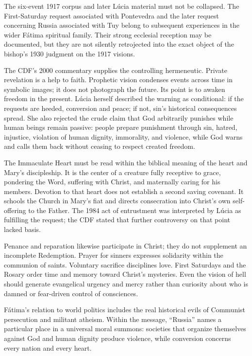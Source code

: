The six-event 1917 corpus and later Lúcia material must not be collapsed. The First-Saturday request associated with Pontevedra and the later request concerning Russia associated with Tuy belong to subsequent experiences in the wider Fátima spiritual family. Their strong ecclesial reception may be documented, but they are not silently retrojected into the exact object of the bishop's 1930 judgment on the 1917 visions.

The CDF's 2000 commentary supplies the controlling hermeneutic. Private revelation is a help to faith. Prophetic vision condenses events across time in symbolic images; it does not photograph the future. Its point is to awaken freedom in the present. Lúcia herself described the warning as conditional: if the requests are heeded, conversion and peace; if not, sin's historical consequences spread. She also rejected the crude claim that God arbitrarily punishes while human beings remain passive: people prepare punishment through sin, hatred, injustice, violation of human dignity, immorality, and violence, while God warns and calls them back without ceasing to respect created freedom.

The Immaculate Heart must be read within the biblical meaning of the heart and Mary's discipleship. It is the center of a creature fully receptive to grace, pondering the Word, suffering with Christ, and maternally caring for his members. Devotion to that heart does not establish a second saving covenant. It schools the Church in Mary's fiat and directs consecration into Christ's own self-offering to the Father. The 1984 act of entrustment was interpreted by Lúcia as fulfilling the request; the CDF stated that further controversy on that point lacked basis.

Penance and reparation likewise participate in Christ; they do not supplement an incomplete Redemption. Prayer for sinners expresses solidarity within the communion of saints. Voluntary sacrifice disciplines love. First Saturdays and the Rosary order time and memory toward Christ's mysteries. Even the vision of hell should generate evangelical urgency and mercy rather than curiosity about who is damned or fear-driven control of consciences.

Fátima's relation to world politics includes the real historical evils of Communist persecution and militant atheism. Within the message, ``Russia'' names a particular place in a universal moral summons: societies that organize themselves against God and human dignity produce violence, while conversion concerns every nation and every heart.

